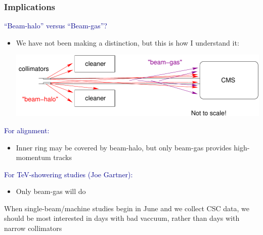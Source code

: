\documentclass[compress]{beamer}
\begin{document}
\begin{frame}
\frametitle{Implications}

\textcolor{darkblue}{``Beam-halo'' versus ``Beam-gas''?}
\begin{itemize}
\item We have not been making a distinction, but this is how I understand it:

\hfill \includegraphics[width=0.8\linewidth]{diagram.pdf}
\end{itemize}

\textcolor{darkblue}{For alignment:}
\begin{itemize}
\item Inner ring may be covered by beam-halo, but only beam-gas provides high-momentum tracks
\end{itemize}

\vfill
\textcolor{darkblue}{For TeV-showering studies (Joe Gartner):}
\begin{itemize}
\item Only beam-gas will do
\end{itemize}

\vfill When single-beam/machine studies begin in June and we collect
CSC data, we should be most interested in days with bad vaccuum, rather
than days with narrow collimators

\label{numpages}
\end{frame}
\end{document}
